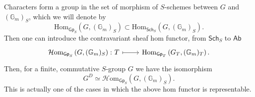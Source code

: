 \begin{rem}\label{rem:DualasHomFct}
	Characters form a group in the set of morphism of $S$-schemes
	between $G$ and $(\mathbb{G}_m)_S$, which we will denote by
	\begin{equation*}
		\mathrm{Hom}_{\mathsf{Gp}_S} \left( G, (\mathbb{G}_m)_S \right)
		\subset
		\mathrm{Hom}_{\mathsf{Sch}_{ S }} \left( G, (\mathbb{G}_m)_S \right)
	.\end{equation*} 
	Then one can introduce the contravariant sheaf hom functor,
	from $\mathsf{Sch}_{ S }$ to $\mathsf{Ab}$
	\begin{equation*}
	\begin{tikzcd}[row sep = 0ex
		,/tikz/column 1/.append style={anchor=base east}
		,/tikz/column 2/.append style={anchor=base west}]
		\mathcal{H}\mathrm{om}_{\mathsf{Gp}_S} \left( G, (\mathbb{G}_m)_S \right)\colon
		T \arrow[r, "", mapsto] & 
		\mathrm{Hom}_{\mathsf{Gp}_T} \left( G_T, (\mathbb{G}_m)_T \right)
	.\end{tikzcd}
	\end{equation*} 
	Then, for a finite, commutative $S$-group $G$ we have the isomorphism
	\begin{equation*}
		G^D \simeq \mathcal{H}\mathrm{om}_{\mathsf{Gp}_S} \left( G, (\mathbb{G}_m)_S \right)
	.\end{equation*} 
	This is actually one of the cases in which the above hom functor
	is representable.
\end{rem}


